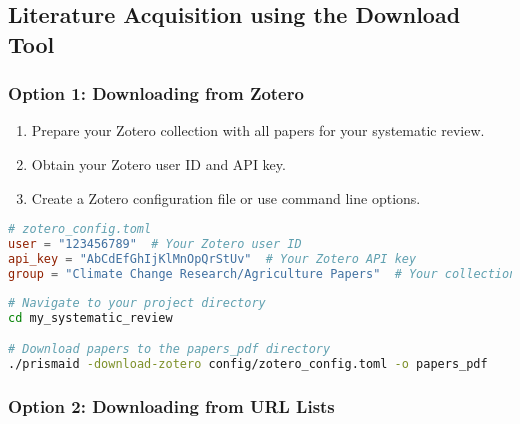 \subsection{Literature Acquisition using the Download Tool}

\subsubsection{Option 1: Downloading from Zotero}

\begin{enumerate}
    \item Prepare your Zotero collection with all papers for your systematic review.
    \item Obtain your Zotero user ID and API key.
    \item Create a Zotero configuration file or use command line options.
\end{enumerate}

\begin{configbox}
\begin{lstlisting}[language=TOML]
# zotero_config.toml
user = "123456789"  # Your Zotero user ID
api_key = "AbCdEfGhIjKlMnOpQrStUv"  # Your Zotero API key
group = "Climate Change Research/Agriculture Papers"  # Your collection path
\end{lstlisting}
\end{configbox}

\begin{commandbox}
\begin{lstlisting}[language=Bash]
# Navigate to your project directory
cd my_systematic_review

# Download papers to the papers_pdf directory
./prismaid -download-zotero config/zotero_config.toml -o papers_pdf
\end{lstlisting}
\end{commandbox}


\subsubsection{Option 2: Downloading from URL Lists}

